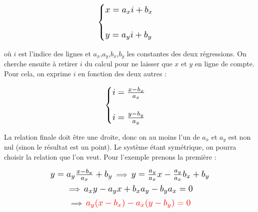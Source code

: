 \documentclass[12pt]{article}
\begin{document}
    \begin{spacing}{1}
        \begin{equation}
            \scalebox{1.25}{$
            \begin{cases}
                x = a_xi + b_x \\
                \\
                y = a_yi + b_y
            \end{cases}
            $}
        \end{equation}
    \end{spacing}
    
    où $i$ est l'indice des lignes et $a_x$,$a_y$,$b_x$,$b_y$ les constantes des deux régressions. On cherche ensuite à retirer $i$ du calcul pour ne laisser que $x$ et $y$ en ligne de compte. Pour cela, on exprime $i$ en fonction des deux autres :

    \begin{spacing}{1}
        \begin{equation}
            \scalebox{1.25}{$
            \begin{cases}
                i = \frac{x - b_x}{a_x} \\
                \\
                i = \frac{y - b_y}{a_y}
            \end{cases}
            $}
        \end{equation}
    \end{spacing}

    La relation finale doit être une droite, donc on au moins l'un de $a_x$ et $a_y$ est non nul (sinon le résultat est un point). Le système étant symétrique, on pourra choisir la relation que l'on veut. Pour l'exemple prenons la première :

    \begin{spacing}{1}
        \begin{equation}
            \scalebox{1.25}{$y = a_y\frac{x - b_x}{a_x} + b_y$}
            \implies
            \scalebox{1.25}{$y = \frac{a_y}{a_x}x - \frac{a_y}{a_x}b_x + b_y$}
        \end{equation}
        \begin{equation}
            \implies
            \scalebox{1.25}{$a_xy - a_yx + b_xa_y - b_ya_x = 0$}
        \end{equation}
        \begin{equation}
            \implies
            \scalebox{1.25}{$\textcolor{red}{a_y(x - b_x) - a_x(y - b_y) = 0}$}
        \end{equation}
    \end{spacing}
\end{document}

